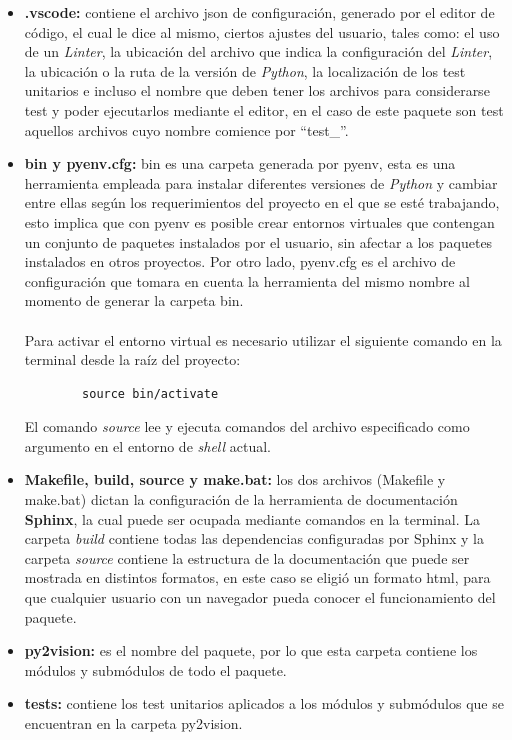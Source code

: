 \begin{itemize}
    \item \textbf{.vscode:} contiene el archivo json de configuración, generado por el editor de código, el cual le dice al mismo, ciertos ajustes del usuario, tales como: el uso de un \textit{Linter}, la ubicación del archivo que indica la configuración del \textit{Linter}, la ubicación o la ruta de la versión de \textit{Python}, la localización de los test unitarios e incluso el nombre que deben tener los archivos para considerarse test y poder ejecutarlos mediante el editor, en el caso de este paquete son test aquellos archivos cuyo nombre comience por ``test\_''.
    \item \textbf{bin y pyenv.cfg:} bin es una carpeta generada por pyenv, esta es una herramienta empleada para instalar diferentes versiones de \textit{Python} y cambiar entre ellas según los requerimientos del proyecto en el que se esté trabajando, esto implica que con pyenv es posible crear entornos virtuales que contengan un conjunto de paquetes instalados por el usuario, sin afectar a los paquetes instalados en otros proyectos. Por otro lado, pyenv.cfg es el archivo de configuración que tomara en cuenta la herramienta del mismo nombre al momento de generar la carpeta bin. 
    \\
    \\
    Para activar el entorno virtual es necesario utilizar el siguiente comando en la terminal desde la raíz del proyecto: 
    \begin{verbatim}
        source bin/activate
    \end{verbatim}
    El comando \textit{source} lee y ejecuta comandos del archivo especificado como argumento en el entorno de \textit{shell} actual.
    \item \textbf{Makefile, build, source y make.bat:} los dos archivos (Makefile y make.bat) dictan la configuración de la herramienta de documentación \textbf{Sphinx}, la cual puede ser ocupada mediante comandos en la terminal. La carpeta \textit{build} contiene todas las dependencias configuradas por Sphinx y la carpeta \textit{source} contiene la estructura de la documentación que puede ser mostrada en distintos formatos, en este caso se eligió un formato html, para que cualquier usuario con un navegador pueda conocer el funcionamiento del paquete.
    \item \textbf{py2vision:} es el nombre del paquete, por lo que esta carpeta contiene los módulos y submódulos de todo el paquete.
    \item \textbf{tests:} contiene los test unitarios aplicados a los módulos y submódulos que se encuentran en la carpeta py2vision.

\end{itemize}
